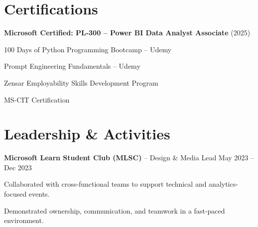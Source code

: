 \documentclass[letterpaper,10pt]{article}
\newenvironment{resume_list}{
  \vspace{-4pt}\begin{itemize}[itemsep=-2pt, leftmargin=18pt]
}{
  \end{itemize}
}
\begin{document}
\section*{Certifications}
\begin{resume_list}
  \item \textbf{Microsoft Certified: PL-300 – Power BI Data Analyst Associate} (2025)
  \item 100 Days of Python Programming Bootcamp – Udemy
  \item Prompt Engineering Fundamentals – Udemy
  \item Zensar Employability Skills Development Program
  \item MS-CIT Certification
\end{resume_list}

\section*{Leadership \& Activities}
\textbf{Microsoft Learn Student Club (MLSC)} – Design \& Media Lead \hfill May 2023 – Dec 2023  
\begin{resume_list}
  \item Collaborated with cross-functional teams to support technical and analytics-focused events.
  \item Demonstrated ownership, communication, and teamwork in a fast-paced environment.
\end{resume_list}
\end{document}
